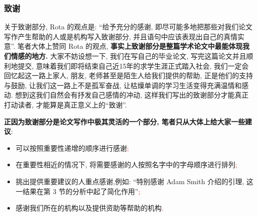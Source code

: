 \documentclass{formatBook}
\newcommand{\XG}[1]{\textcolor{red}{#1}}
\begin{document}
\subsubsection{致谢}
关于致谢部分, Rota 的观点是: ``给予充分的感谢, 即尽可能多地把那些对我们论文写作产生帮助的人或是机构写入致谢部分, 并且语句中应该表现出自己的真情实意''\cite{RotaTen1997}. 笔者大体上赞同 Rota 的观点, \textbf{事实上致谢部分是整篇学术论文中最能体现我们情感的地方. }大家不妨设想一下, 我们在写自己的毕业论文, 写完这篇论文并且顺利地提交, 意味着我们即将结束自己近15年的求学生涯正式踏入社会, 我们一定会回忆起这一路上家人, 朋友, 老师甚至是陌生人给我们提供的帮助, 正是他们的支持与鼓励, 让我们这一路上不是孤军奋战, 让枯燥单调的学习生活变得充满温情和感动. 想到这我们自然会有抒发自己感情的冲动, 这样我们写出的致谢部分才能真正打动读者, 才能算是真正意义上的``致谢''.
\par \textbf{正因为致谢部分是论文写作中极其灵活的一个部分, 笔者只从大体上给大家一些建议}:
\begin{itemize}
    \item 可以按照重要性递增的顺序进行感谢\XG{;}
    \item 在重要性相近的情况下, 将需要感谢的人按照名字中的字母顺序进行排列\XG{;}
    \item 挑出提供重要建议的人重点感谢,例如: ``特别感谢 Adam Smith 介绍的引理, 这一结果在第 3 节的分析中起了简化作用''\XG{;}
    \item 感谢我们所在的机构以及提供资助等帮助的机构\XG{.}
\end{itemize}
\end{document}
